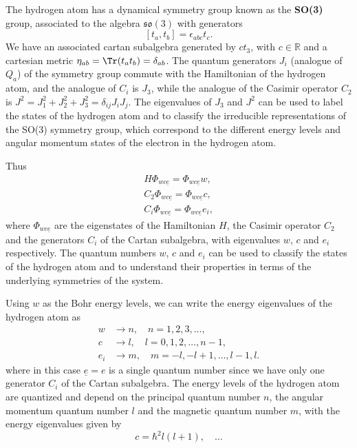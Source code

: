 \begin{example}
    The hydrogen atom has a dynamical symmetry group known as the \textbf{SO(3)} group, associated to the algebra \(\mathfrak{so}(3)\) with generators
    \[
        [t_a, t_b] = \epsilon_{abc} t_c.
    \]
    We have an associated cartan subalgebra generated by \(c t_3\), with \(c \in \mathbb{R}\)  and a cartesian metric \(\eta_{ab} = \Tr(t_a t_b) = \delta_{ab}\). The quantum generators \(J_i\) (analogue of \(Q_a\)) of the symmetry group commute with the Hamiltonian of the hydrogen atom, and the analogue of \(C_i\) is \(J_3\), while the analogue of the Casimir operator \(C_2\) is \(J^2 = J_1^2 + J_2^2 + J_3^2 = \delta_{ij} J_i J_j\). The eigenvalues of \(J_3\) and \(J^2\) can be used to label the states of the hydrogen atom and to classify the irreducible representations of the SO(3) symmetry group, which correspond to the different energy levels and angular momentum states of the electron in the hydrogen atom.

    Thus
    \[
        \begin{aligned}
            H \Phi_{w c \underline{e}} = \Phi_{w c \underline{e}} w,   \\
            C_2 \Phi_{w c \underline{e}} = \Phi_{w c \underline{e}} c, \\
            C_i \Phi_{w c \underline{e}} = \Phi_{w c \underline{e}} e_i,
        \end{aligned}
    \]
    where \(\Phi_{w c \underline{e}}\) are the eigenstates of the Hamiltonian \(H\), the Casimir operator \(C_2\) and the generators \(C_i\) of the Cartan subalgebra, with eigenvalues \(w\), \(c\) and \(e_i\) respectively. The quantum numbers \(w\), \(c\) and \(e_i\) can be used to classify the states of the hydrogen atom and to understand their properties in terms of the underlying symmetries of the system.

    Using \(w\) as the Bohr energy levels, we can write the energy eigenvalues of the hydrogen atom as
    \[
        \begin{aligned}
            w   & \to n, \quad n = 1, 2, 3, \dots,          \\
            c   & \to l, \quad l = 0, 1, 2, \dots, n-1,     \\
            e_i & \to m, \quad m = -l, -l+1, \dots, l-1, l.
        \end{aligned}
    \]
    where in this case \(\underline{e} = e\) is a single quantum number since we have only one generator \(C_i\) of the Cartan subalgebra. The energy levels of the hydrogen atom are quantized and depend on the principal quantum number \(n\), the angular momentum quantum number \(l\) and the magnetic quantum number \(m\), with the energy eigenvalues given by
    \[
        c = \hbar^2 l (l+1), \quad \dots
    \]
\end{example}

